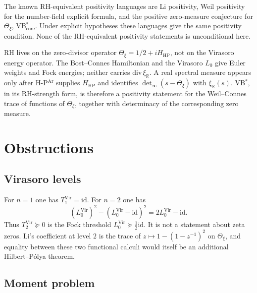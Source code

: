 \begin{remark}
\label{v4-arith:vb:rem:equiv-domain}
The known RH-equivalent positivity languages are Li positivity, Weil
positivity for the number-field explicit formula, and the positive
zero-measure conjecture for \(\Theta_{\xi}\),
VB\(^{*}_{\mathrm{core}}\). Under explicit hypotheses these languages
give the same positivity condition. None of the RH-equivalent
positivity statements is unconditional here.
\end{remark}

\begin{remark}
\label{v4-arith:vb:rem:rh-level}
RH lives on the zero-divisor operator
\(\Theta_{\xi}=1/2+iH_{\mathrm{HP}}\), not on the Virasoro energy
operator. The Bost--Connes Hamiltonian and the Virasoro \(L_{0}\)
give Euler weights and Fock energies; neither carries
\(\mathrm{div}\,\xi_{\mathbb R}\). A real spectral measure appears only after
H-P\(^{\mathrm{Ar}}\) supplies \(H_{\mathrm{HP}}\) and identifies
\(\det_{\infty}(s-\Theta_{\xi})\) with \(\xi_{\mathbb R}(s)\).
VB\(^{*}\), in its RH-strength form, is therefore a positivity
statement for the Weil--Connes trace of functions of
\(\Theta_{\xi}\), together with determinacy of the corresponding
zero measure.
\end{remark}

\section{Obstructions}
\label{v4-arith:vb:table}

\subsection{Virasoro levels}
\label{v4-arith:vb:cycle:A1}

For \(n=1\) one has \(T_{1}^{\mathrm{Vir}}=\mathrm{id}\). For
\(n=2\) one has
\[
(L_{0}^{\mathrm{Vir}})^{2}-(L_{0}^{\mathrm{Vir}}-\mathrm{id})^{2}
=2L_{0}^{\mathrm{Vir}}-\mathrm{id}.
\]
Thus \(T_{2}^{\mathrm{Vir}}\succeq0\) is the Fock threshold
\(L_{0}^{\mathrm{Vir}}\succeq\frac12\mathrm{id}\). It is not a
statement about zeta zeros. Li's coefficient at level \(2\) is the
trace of \(z\mapsto1-(1-z^{-1})^{2}\) on \(\Theta_{\xi}\), and equality
between these two functional calculi would itself be an additional
Hilbert--P\'olya theorem.

\subsection{Moment problem}
\label{v4-arith:vb:cycle:A2}

